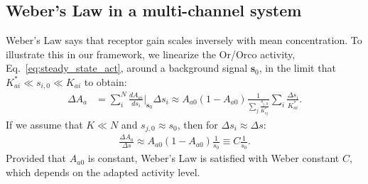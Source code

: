 \documentclass[9pt,twoside]{pnas-new}
\begin{document}
\subsection*{Weber's Law in a multi-channel system}
Weber's Law says that receptor gain scales inversely with mean concentration. To illustrate this in our framework, we linearize the Or/Orco activity, Eq.~\ref{eq:steady_state_act}, around a background signal $\mathbf s_0$, in the limit that $K^*_{ai} \ll s_{i, 0} \ll K_{ai}$ to obtain:
\begin{align}
    \Delta A_a &= 
    \sum_i^N\frac{dA_{ai}}{ds_i}\bigg|_{\mathbf s_0}\Delta s_i \approx A_{a0}(1 - A_{a0})\frac{1}{\sum_j\frac{s_{j, 0}}{K^*_{aj}}}\sum_i\frac{\Delta s_i}{K^*_{ai}}.
    \label{eq:WL_gain_no_approx}
\end{align}
If we assume that $K \ll N$ and $s_{j, 0} \approx s_0$, then for $\Delta s_i \approx \Delta s$:
\begin{align}
    \frac{\Delta A_a}{\Delta s} 
    \approx A_{a0}(1 - A_{a0})\frac{1}{s_0}
    \equiv C\frac{1}{s_0}.
    \label{eq:WL_gain}
\end{align}
Provided that $A_{a0}$ is constant, Weber's Law is satisfied with Weber constant $C$, which depends on the adapted activity level. %
\end{document}
